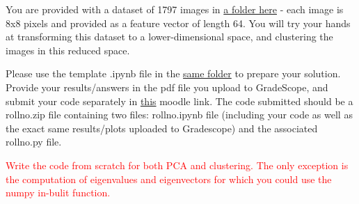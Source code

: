 \documentclass[solution,addpoints,12pt]{exam}
\newcommand{\red}[1]{\textcolor{red}{#1}}
\begin{document}
\begin{questions}
You are provided with a dataset of 1797 images in \href{https://drive.google.com/drive/folders/15msU-s48DApWteNbo9vNRXKAyid-HwwJ?usp=sharing}{a folder here} - each image is 8x8 pixels and provided as a feature vector of length 64. You will try your hands at transforming this dataset to a lower-dimensional space, and clustering the images in this reduced space. 

Please use the template .ipynb file in the \href{https://drive.google.com/drive/folders/15msU-s48DApWteNbo9vNRXKAyid-HwwJ?usp=sharing}{same folder} to prepare your solution. Provide your results/answers in the pdf file you upload to GradeScope, and submit your code separately in \href{https://courses.iitm.ac.in/mod/assign/view.php?id=78101}{this} moodle link. The code submitted should be a rollno.zip file containing two files: rollno.ipynb file (including your code as well as the exact same results/plots uploaded to Gradescope) and the associated rollno.py file.

\red{Write the code from scratch for both PCA and clustering. The only exception is the computation of eigenvalues and eigenvectors for which you could use the numpy in-bulit function.}

\end{questions}
\end{document}

